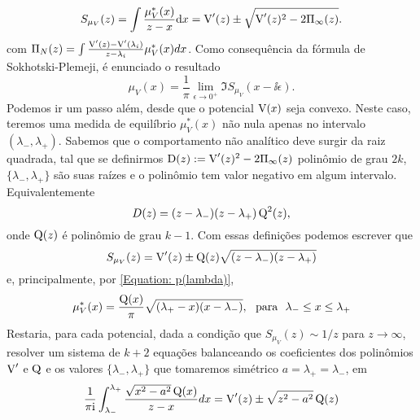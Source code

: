 \begin{equation}
	S_{\mu_V}(z) = \int \frac{\mu^*_V(x)}{z - x} \dd x= \operatorname{V}'(z) \pm \sqrt{\operatorname{V}'(z)^2 - 2 \Pi_{\infty}(z) }.
	\label{Equation: Resolvent}
\end{equation}
com $\Pi_N(z) = \int \frac{\operatorname{V}'(z) - \operatorname{V}'(\lambda_i)}{z - \lambda_i} \mu^*_V(x) dx$. Como consequência da fórmula de Sokhotski-Plemeji, é enunciado o resultado 
\begin{equation}
	\mu_V(x) = \frac{1}{\pi} \lim_{\epsilon \to 0^+} \Im{S_{\mu_V}(x - \ii\epsilon)}.
	\label{Equation: p(lambda)}
\end{equation}
Podemos ir um passo além, desde que o potencial $\operatorname{V}(x)$ seja convexo. Neste caso, teremos uma medida de equilíbrio $\mu^*_V(x)$ não nula apenas no intervalo $(\lambda_{-}, \lambda_{+})$. Sabemos que o comportamento não analítico deve surgir da raiz quadrada, tal que se definirmos $\operatorname{D}(z) := \operatorname{V}'(z)^2 - 2 \Pi_{\infty}(z)$ polinômio de grau $2k$, $\{\lambda_{-}, \lambda_{+}\}$ são suas raízes e o polinômio tem valor negativo em algum intervalo. Equivalentemente $$D(z) = (z-\lambda_{-})(z - \lambda_{+}) \operatorname{Q}^2(z),$$ onde $\operatorname{Q}(z)$ é polinômio de grau $k-1$. Com essas definições podemos escrever que $$S_{\mu_V}(z) = \operatorname{V}'(z) \pm \operatorname{Q}(z) \sqrt{(z - \lambda_{-})(z - \lambda_{+})}$$ e, principalmente, por \ref{Equation: p(lambda)},
\begin{equation}
	\mu^*_V(x) =\frac{\operatorname{Q}(x)}{\pi} \sqrt{(\lambda_{+} - x)(x - \lambda_{-})}, \ \ \text{para} \ \  \lambda_{-} \leq x \leq \lambda_{+}
\end{equation}
Restaria, para cada potencial, dada a condição que $S_{\mu_V}(z) \sim 1/z$ para $z \rightarrow \infty$, resolver um sistema de $k+2$ equações balanceando os coeficientes dos polinômios $\operatorname{V}'$ e $\operatorname{Q}$ e os valores $\{\lambda_{-}, \lambda_{+}\}$ que tomaremos simétrico $a = \lambda_{+} = \lambda_{-}$, em
\[
\frac{1}{\pi \mathrm{i}} \int_{\lambda_{-}}^{\lambda_{+}} \frac{\sqrt{x^2 - a^2}\operatorname{Q}(x)}{z-x} dx = \operatorname{V}'(z) \pm \sqrt{z^2 - a^2}\operatorname{Q}(z) 
\]



